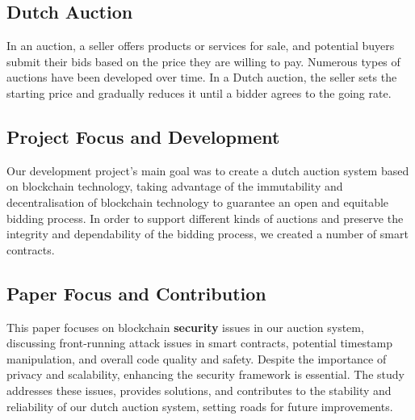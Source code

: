 \documentclass[conference]{IEEEtran}
\begin{document}
\subsection{Dutch Auction}
In an auction, a seller offers products or services for sale, and potential buyers submit their bids based on the price they are willing to pay. Numerous types of auctions have been developed over time. In a Dutch auction, the seller sets the starting price and gradually reduces it until a bidder agrees to the going rate\cite{bennettGoingGoingGone2020}.

\subsection{Project Focus and Development}

Our development project's main goal was to create a dutch auction system based on blockchain technology, taking advantage of the immutability and decentralisation of blockchain technology to guarantee an open and equitable bidding process. In order to support different kinds of auctions and preserve the integrity and dependability of the bidding process, we created a number of smart contracts.
 

\subsection{Paper Focus and Contribution}

This paper focuses on blockchain \textbf{security} issues in our auction system, discussing front-running attack issues in smart contracts, potential timestamp manipulation, and overall code quality and safety. Despite the importance of privacy and scalability, enhancing the security framework is essential. The study addresses these issues, provides solutions, and contributes to the stability and reliability of our dutch auction system, setting roads for future improvements.


\end{document}
